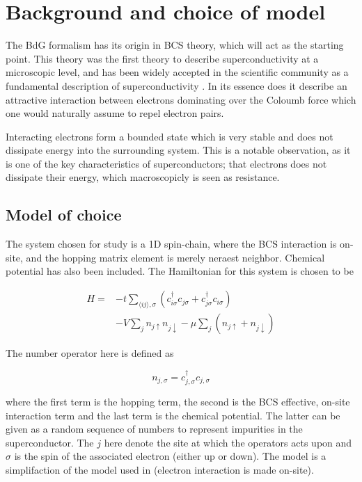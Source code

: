 \documentclass[11pt]{article}
\begin{document}
\section{Background and choice of model}\label{sec:background}

The BdG formalism has its origin in BCS theory, which will act as the starting point. This theory was the first theory to describe superconductivity at a microscopic level, and has been widely accepted in the scientific community as a fundamental description of superconductivity \cite{girvinModernCondensedMatter2019, sharmaReviewTheoriesSuperconductivity2015}. In its essence does it describe an attractive interaction between electrons dominating over the Coloumb force which one would naturally assume to repel electron pairs. 

Interacting electrons form a bounded state which is very stable and does not dissipate energy into the surrounding system. This is a notable observation, as it is one of the key characteristics of superconductors; that electrons does not dissipate their energy, which macroscopicly is seen as resistance.

\subsection{Model of choice}

The system chosen for study is a 1D spin-chain, where the BCS interaction is on-site, and the hopping matrix element is merely neraest neighbor. Chemical potential has also been included. The Hamiltonian for this system is chosen to be 

\begin{align}\label{eq:model}
	H = &-t \sum_{\langle i j\rangle, \sigma}\left(c_{i \sigma}^{\dagger} c_{j \sigma} + c_{j \sigma}^{\dagger} c_{i \sigma}\right) \nonumber \\ 
	    &- V \sum_j n_{j \uparrow} n_{j \downarrow} -\mu \sum_j\left(n_{j \uparrow}+n_{j \downarrow}\right) 
\end{align}

The number operator here is defined as

\begin{equation}
	n_{j, \sigma} = c_{j, \sigma}^\dagger c_{j, \sigma}
\end{equation}

where the first term is the hopping term, the second is the BCS effective, on-site interaction term and the last term is the chemical potential. The latter can be given as a random sequence of numbers to represent impurities in the superconductor. %
The $j$ here denote the site at which the operators acts upon and $\sigma$ is the spin of the associated electron (either up or down). The model is a simplifaction of the model used in \cite{zhangChiralPwaveSuperconducting2019} (electron interaction is made on-site). 
\end{document}
